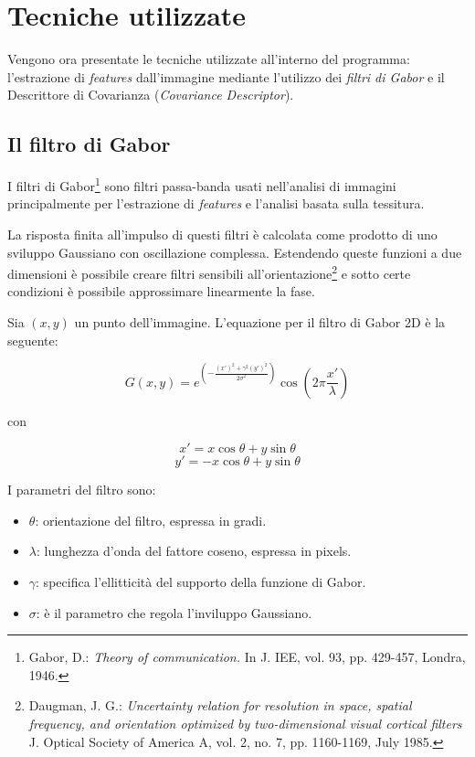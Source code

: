 \section{Tecniche utilizzate}

Vengono ora presentate le tecniche utilizzate all'interno del programma: l'estrazione di \emph{features} dall'immagine mediante l'utilizzo dei \emph{filtri di Gabor} e il Descrittore di Covarianza (\emph{Covariance Descriptor}).

\subsection{Il filtro di Gabor}

I filtri di Gabor\footnote{Gabor, D.: \emph{Theory of communication.} In J. IEE, vol. 93, pp. 429-457, Londra, 1946.} sono filtri passa-banda usati nell'analisi di immagini principalmente per l'estrazione di \emph{features} e l'analisi basata sulla tessitura.

La risposta finita all'impulso di questi filtri è calcolata come prodotto di uno sviluppo Gaussiano con oscillazione complessa. Estendendo queste funzioni a due dimensioni è possibile creare filtri sensibili all'orientazione\footnote{Daugman, J. G.: \emph{Uncertainty relation for resolution in space, spatial frequency, and orientation optimized by two-dimensional visual cortical filters} J. Optical Society of America A, vol. 2, no. 7, pp. 1160-1169, July 1985.} e sotto certe condizioni è possibile approssimare linearmente la fase.

Sia $(x, y)$ un punto dell'immagine. L'equazione per il filtro di Gabor 2D è la seguente:

$$G(x, y) = e^{(- \frac{(x')^2 + \gamma^2 (y')^2}{2 \sigma^2})} \cos (2 \pi \frac{x'}{\lambda})  $$ 

con 

$$x' = x \cos \theta + y \sin \theta$$
$$y' = - x \cos \theta + y \sin \theta$$

I parametri del filtro sono:
\begin{itemize}
\item $\theta$: orientazione del filtro, espressa in gradi.
\item $\lambda$: lunghezza d'onda del fattore coseno, espressa in pixels.
\item $\gamma$: specifica l'ellitticità del supporto della funzione di Gabor.
\item $\sigma$: è il parametro che regola l'inviluppo Gaussiano.
\end{itemize}

